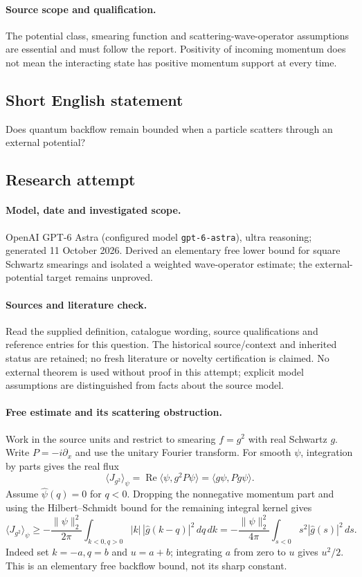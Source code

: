 \documentclass[11pt]{article}
\begin{document}
\paragraph{Source scope and qualification.}
The potential class, smearing function and scattering-wave-operator assumptions are essential and must follow the report. Positivity of incoming momentum does not mean the interacting state has positive momentum support at every time.
\subsection{Short English statement}
Does quantum backflow remain bounded when a particle scatters through an external potential?
\subsection{Research attempt}
\paragraph{Model, date and investigated scope.}
OpenAI GPT-6 Astra (configured model \texttt{gpt-6-astra}), ultra reasoning; generated 11 October 2026. Derived an elementary free lower bound for square Schwartz smearings and isolated a weighted wave-operator estimate; the external-potential target remains unproved.

\paragraph{Sources and literature check.}
Read the supplied definition, catalogue wording, source qualifications and reference entries for this question. The historical source/context and inherited status are retained; no fresh literature or novelty certification is claimed. No external theorem is used without proof in this attempt; explicit model assumptions are distinguished from facts about the source model.

\paragraph{Free estimate and its scattering obstruction.} Work in the source units and restrict to smearing \(f=g^2\) with real Schwartz \(g\). Write \(P=-i\partial_x\) and use the unitary Fourier transform. For smooth \(\psi\), integration by parts gives the real flux
\[
 \langle J_{g^2}\rangle_\psi=\operatorname{Re}\langle\psi,g^2P\psi\rangle=\langle g\psi,Pg\psi\rangle.
\]
Assume \(\widehat\psi(q)=0\) for \(q<0\). Dropping the nonnegative momentum part and using the Hilbert--Schmidt bound for the remaining integral kernel gives
\[
 \langle J_{g^2}\rangle_\psi\ge-\frac{\|\psi\|_2^2}{2\pi}
 \int_{k<0,q>0}|k|\,|\widehat g(k-q)|^2\,dq\,dk
 =-\frac{\|\psi\|_2^2}{4\pi}\int_{s<0}s^2|\widehat g(s)|^2\,ds.
\]
Indeed set \(k=-a,q=b\) and \(u=a+b\); integrating \(a\) from zero to \(u\) gives \(u^2/2\). This is an elementary free backflow bound, not its sharp constant.
\end{document}
